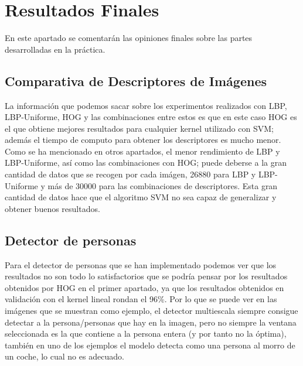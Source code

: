 \chapter{Resultados Finales}
En este apartado se comentarán las opiniones finales sobre las partes desarrolladas en la práctica.

\section{Comparativa de Descriptores de Imágenes}
La información que podemos sacar sobre los experimentos realizados con LBP, LBP-Uniforme, HOG y las combinaciones entre estos es que en este caso HOG es el que obtiene mejores resultados para cualquier kernel utilizado con SVM; además el tiempo de computo para obtener los descriptores es mucho menor. Como se ha mencionado en otros apartados, el menor rendimiento de LBP y LBP-Uniforme, así como las combinaciones con HOG; puede deberse a la gran cantidad de datos que se recogen por cada imágen, 26880 para LBP y LBP-Uniforme y más de 30000 para las combinaciones de descriptores. Esta gran cantidad de datos hace que el algoritmo SVM no sea capaz de generalizar y obtener buenos resultados.

\section{Detector de personas}
Para el detector de personas que se han implementado podemos ver que los resultados no son todo lo satisfactorios que se podría pensar por los resultados obtenidos por HOG en el primer apartado, ya que los resultados obtenidos en validación con el kernel lineal rondan el 96\%. Por lo que se puede ver en las imágenes que se muestran como ejemplo, el detector multiescala siempre consigue detectar a la persona/personas que hay en la imagen, pero no siempre la ventana seleccionada es la que contiene a la persona entera (y por tanto no la óptima), también en uno de los ejemplos el modelo detecta como una persona al morro de un coche, lo cual no es adecuado. 